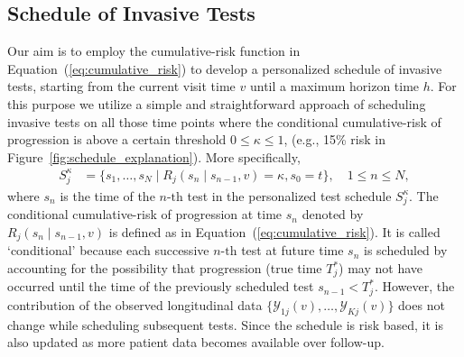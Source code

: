 \subsection{Schedule of Invasive Tests}
\label{subsec:pers_schedule}
Our aim is to employ the cumulative-risk function in Equation~(\ref{eq:cumulative_risk}) to develop a personalized schedule of invasive tests, starting from the current visit time $v$ until a maximum horizon time $h$. For this purpose we utilize a simple and straightforward approach of scheduling invasive tests on all those time points where the conditional cumulative-risk of progression is above a certain threshold $0 \leq \kappa \leq 1$, (e.g., 15\% risk in Figure~\ref{fig:schedule_explanation}). More specifically,
\begin{equation}
\label{eq:personalized_schedule}
\begin{split}
S_j^{\kappa} &= \big\{s_1, \ldots, s_{N} \mid R_j(s_n \mid s_{n-1}, v) = \kappa, s_0 = t \big\}, \quad 1 \leq n \leq N,
\end{split}
\end{equation}
where $s_n$ is the time of the ${n\mbox{-th}}$ test in the personalized test schedule $S_j^{\kappa}$. The conditional cumulative-risk of progression at time $s_n$ denoted by $R_j(s_n \mid s_{n-1}, v)$ is defined as in Equation~(\ref{eq:cumulative_risk}). It is called `conditional' because each successive ${n\mbox{-th}}$ test at future time $s_{n}$ is scheduled by accounting for the possibility that progression (true time $T^*_j$) may not have occurred until the time of the previously scheduled test $s_{n-1} < T^*_j$. However, the contribution of the observed longitudinal data $\{\mathcal{Y}_{1j}(v), \ldots, \mathcal{Y}_{Kj}(v)\}$ does not change while scheduling subsequent tests. Since the schedule is risk based, it is also updated as more patient data becomes available over follow-up.

